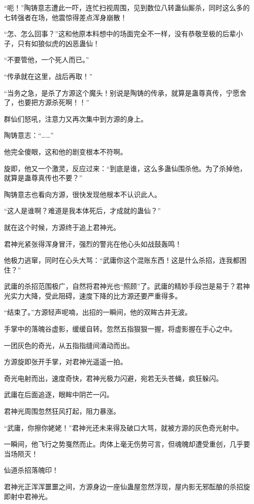 \begin{this_body}
“呃！”陶铸意志遭此一吓，连忙扫视周围，见到数位八转蛊仙厮杀，同时这么多的七转强者在场，他震惊得差点浑身崩散！

“怎、怎么回事？”这和他原本料想中的场面完全不一样，没有恭敬至极的后辈小子，只有如狼似虎的凶恶蛊仙！

“不要管他，一个死人而已。”

“传承就在这里，战后再取！”

“当务之急，是杀了方源这个魔头！别说是陶铸的传承，就算是蛊尊真传，宁愿舍了，也要把方源杀死啊！！”

群仙们怒吼，注意力又再次集中到方源的身上。

陶铸意志：“……”

他完全傻眼，这和他的剧变根本不符啊。

旋即，他又一个激灵，反应过来：“到底是谁，这么多蛊仙围杀他。为了杀掉他，就算是蛊尊真传也不要？”

陶铸意志也看向方源，很快发现他根本不认识此人。

“这人是谁啊？难道是我本体死后，才成就的蛊仙？”

就在这个时候，方源终于追上君神光。

君神光紧张得浑身冒汗，强烈的警兆在他心头如战鼓轰鸣！

他极力逃窜，同时在心头大骂：“武庸你这个混账东西！这是什么杀招，连我都困住？”

武庸的杀招范围极广，自然将君神光也“照顾”了。武庸的精妙手段岂是易于？君神光实力大降，受此阻碍，速度下降的比方源还要严重得多。

“结束了。”方源轻声呢喃，出招的一瞬间，他的双眸古井无波。

手掌中的落魄谷虚影，缓缓自转。忽然五指狠狠一握，将虚影握在手心之中。

一团灰色的奇光，从五指指缝间涌动而出。

方源旋即张开手掌，对君神光遥遥一拍。

奇光电射而出，速度奇快，君神光极力闪避，宛若无头苍蝇，疯狂躲闪。

武庸在后面追逐，眼眸中阴芒一闪。

君神光周围忽然狂风打起，阻力暴涨。

“武庸，你擦你姥姥！”君神光还未来得及破口大骂，就被方源的灰色奇光射中。

一瞬间，他飞行之势戛然而止。肉体上毫无伤势可言，但魂魄却遭受重创，几乎要当场陨灭！

仙道杀招落魄印！

君神光正浑浑噩噩之间，方源身边一座仙蛊屋忽然浮现，屋内影无邪酝酿的杀招旋即射中君神光。


\end{this_body}
